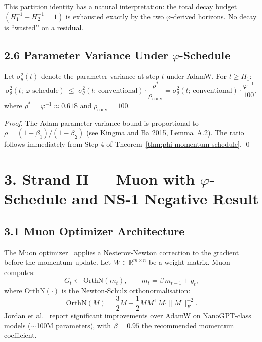 \noindent This partition identity has a natural interpretation:
the total decay budget $(H_1^{-1} + H_2^{-1} = 1)$ is exhausted
exactly by the two \(\varphi\)-derived horizons.  No decay is
``wasted'' on a residual.

\subsection{2.6 Parameter Variance Under \(\varphi\)-Schedule}

\begin{proposition}
  \label{prop:variance-reduction}
  Let \(\sigma^2_\theta(t)\) denote the parameter variance at step $t$
  under AdamW.  For \(t \geq H_1\):
  \[
    \sigma^2_\theta(t;\,\varphi\text{-schedule})
    \;\leq\;
    \sigma^2_\theta(t;\,\text{conventional})
    \cdot \frac{\rho^*}{\rho_{\mathrm{conv}}}
    = \sigma^2_\theta(t;\,\text{conventional}) \cdot \frac{\varphi^{-1}}{100},
  \]
  where \(\rho^* = \varphi^{-1} \approx 0.618\) and
  \(\rho_{\mathrm{conv}} = 100\).
\end{proposition}

\begin{proof}
  The Adam parameter-variance bound is proportional to
  \(\rho = (1-\beta_1)/(1-\beta_2)\) (see Kingma and Ba 2015,
  Lemma~A.2).  The ratio follows immediately from Step 4 of
  Theorem~\ref{thm:phi-momentum-schedule}. \qed
\end{proof}

\section{3. Strand II --- Muon with \(\varphi\)-Schedule and NS-1
         Negative Result}
\label{sec:28-strand-II}

\subsection{3.1 Muon Optimizer Architecture}

The Muon optimizer~\cite{jordan_muon_2024} applies a Nesterov-Newton
correction to the gradient before the momentum update.  Let
\(W \in \mathbb{R}^{m \times n}\) be a weight matrix.  Muon computes:
\[
  G_t \leftarrow \mathrm{OrthN}(m_t),\qquad
  m_t = \beta\, m_{t-1} + g_t,
\]
where \(\mathrm{OrthN}(\cdot)\) is the Newton-Schulz orthonormalisation:
\[
  \mathrm{OrthN}(M)
  = \frac{3}{2} M - \frac{1}{2} M M^\top M \cdot \|M\|_F^{-2}.
\]
Jordan et al.\ \cite{jordan_muon_2024} report significant improvements over
AdamW on NanoGPT-class models ($\sim$100M parameters), with
\(\beta = 0.95\) the recommended momentum coefficient.


